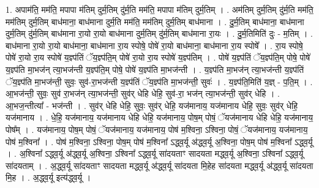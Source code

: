 \documentclass[17pt]{extarticle}
\begin{document}
1. अपाम॑ति॒ मम॑ति॒ मपापा म॑तिम् दुर्म॒तिम् दु॑र्म॒ति मम॑ति॒ मपापा म॑तिम् दुर्म॒तिम् । . अम॑तिम् दुर्म॒तिम् दु॑र्म॒ति मम॑ति॒ मम॑तिम् दुर्म॒तिम् बाध॑माना॒ बाध॑माना दुर्म॒ति मम॑ति॒ मम॑तिम् दुर्म॒तिम् बाध॑माना । . दु॒र्म॒तिम् बाध॑माना॒ बाध॑माना दुर्म॒तिम् दु॑र्म॒तिम् बाध॑माना रा॒यो रा॒यो बाध॑माना दुर्म॒तिम् दु॑र्म॒तिम् बाध॑माना रा॒यः । . दु॒र्म॒तिमिति॑ दुः - म॒तिम् । . बाध॑माना रा॒यो रा॒यो बाध॑माना॒ बाध॑माना रा॒य स्पोषे॒ पोषे॑ रा॒यो बाध॑माना॒ बाध॑माना 
रा॒य स्पोषे᳚ । . रा॒य स्पोषे॒ पोषे॑ रा॒यो रा॒य स्पोषे॑ य॒ज्ञ्प॑तिं ॅय॒ज्ञ्प॑ति॒म् पोषे॑ रा॒यो रा॒य स्पोषे॑ य॒ज्ञ्प॑तिम् । . पोषे॑ य॒ज्ञ्प॑तिं ॅय॒ज्ञ्प॑ति॒म् पोषे॒ पोषे॑ य॒ज्ञ्प॑ति मा॒भज॑न् त्या॒भज॑न्ती य॒ज्ञ्प॑ति॒म् पोषे॒ पोषे॑ य॒ज्ञ्प॑ति मा॒भज॑न्ती । . य॒ज्ञ्प॑ति मा॒भज॑न् त्या॒भज॑न्ती य॒ज्ञ्प॑तिं ॅय॒ज्ञ्प॑ति मा॒भज॑न्ती॒ सुवः॒ सुव॑-रा॒भज॑न्ती य॒ज्ञ्प॑तिं ॅय॒ज्ञ्प॑ति मा॒भज॑न्ती॒ सुवः॑ । . य॒ज्ञ्प॑ति॒मिति॑ य॒ज्ञ् - प॒ति॒म् । . आ॒भज॑न्ती॒ सुवः॒ सुव॑ रा॒भज॑न् त्या॒भज॑न्ती॒ सुव॑र् धेहि धेहि॒ सुव॑-रा॒ भज॑न् त्या॒भज॑न्ती॒ सुव॑र् धेहि । . आ॒भज॒न्तीत्या᳚ - भज॑न्ती । . सुव॑र् धेहि धेहि॒ सुवः॒ सुव॑र् धेहि॒ यज॑मानाय॒ यज॑मानाय धेहि॒ सुवः॒ सुव॑र् धेहि॒ यज॑मानाय । . धे॒हि॒ यज॑मानाय॒ यज॑मानाय धेहि धेहि॒ यज॑मानाय॒ पोष॒म् पोषं॒ ॅयज॑मानाय धेहि धेहि॒ यज॑मानाय॒ पोष᳚म् । . यज॑मानाय॒ पोष॒म् पोषं॒ ॅयज॑मानाय॒ यज॑मानाय॒ पोष॑ म॒श्विना॒ ऽश्विना॒ पोषं॒ ॅयज॑मानाय॒ यज॑मानाय॒ पोष॑ म॒श्विना᳚ । . पोष॑ म॒श्विना॒ ऽश्विना॒ पोष॒म् पोष॑ म॒श्विना᳚ ऽद्ध्व॒र्यू अ॑द्ध्व॒र्यू अ॒श्विना॒ पोष॒म् पोष॑ म॒श्विना᳚ ऽद्ध्व॒र्यू । . अ॒श्विना᳚ ऽद्ध्व॒र्यू अ॑द्ध्व॒र्यू अ॒श्विना॒ ऽश्विना᳚ ऽद्ध्व॒र्यू सा॑दयताꣳ सादयता मद्ध्व॒र्यू अ॒श्विना॒ ऽश्विना᳚ ऽद्ध्व॒र्यू सा॑दयताम् । . अ॒द्ध्व॒र्यू सा॑दयताꣳ सादयता मद्ध्व॒र्यू अ॑द्ध्व॒र्यू सा॑दयता मि॒हेह सा॑दयता मद्ध्व॒र्यू अ॑द्ध्व॒र्यू सा॑दयता मि॒ह । . अ॒द्ध्व॒र्यू इत्य॑द्ध्व॒र्यू । \newline
\end{document}

